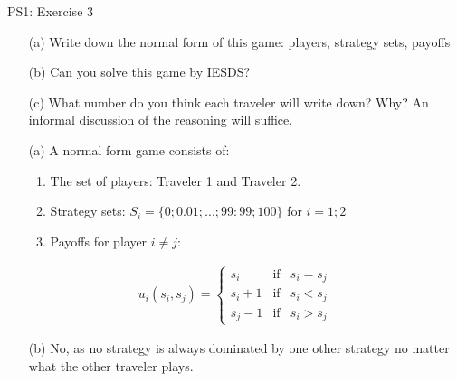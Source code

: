 \begin{frame}{PS1: Exercise 3}
\begin{multicols}{2}
  \begin{itemize}
    \item[(a)] Write down the normal form of this game: players, strategy sets, payoffs
  \item[(b)] Can you solve this game by IESDS?
  \item[(c)] What number do you think each traveler will write down? Why? An informal
  discussion of the reasoning will suffice.
  \end{itemize}
\vfill\null \columnbreak
\begin{itemize}
  \item[(a)] A normal form game consists of:
    \begin{enumerate}
      \item The set of players: Traveler 1 and Traveler 2.
      \item Strategy sets: $S_i = \{0; 0.01; ... ; 99:99; 100\}$ for $i = 1; 2$
      \item Payoffs for player $i\neq j$:
    \end{enumerate}
\end{itemize}
\begin{align*}
  u_i(s_i,s_j)=
  \left\{ \begin{array}{ccl}
  s_i   & \mbox{if} & s_i=s_j \\
  s_i+1 & \mbox{if} & s_i<s_j \\
  s_j-1 & \mbox{if} & s_i>s_j
  \end{array}\right.
\end{align*}
\begin{itemize}
  \item[(b)] No, as no strategy is always dominated by one other strategy no matter what the other traveler plays.
\end{itemize}
\vfill\null
\end{multicols}
\end{frame}

